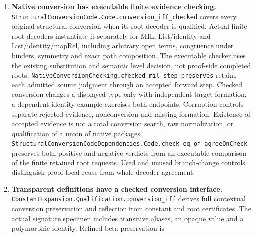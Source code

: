 \documentclass[11pt]{article}
\theoremstyle{definition}
\theoremstyle{remark}
\begin{document}
\begin{enumerate}
  exact original conversion with its conservative proof-only completion.
  Retained metadata coherence, binding laws and cofinal development give
  \nolinkurl{NativeRelatorConversionParallel.diamond} and the actual Pi/Sigma
  boundaries. \nolinkurl{FormationSensitiveNativeRelatorQualification.steps_preserve}
  preserves independently admitted judgments through all finite contextual
  runs of the original five-root package. Its checked-step interface needs
  no additional target-typing premise. Conversion cannot identify Pi or
  Sigma with a universe head; every purported finite code across either
  boundary fails. Neither original execution confluence nor normalization
  is claimed. The positive mixed-metadata completion control has no exact
  authored root, so the proof presentation is not a replacement runtime.
\item \textbf{Native conversion has executable finite evidence checking.}
  \nolinkurl{StructuralConversionCode.Code.conversion_iff_checked} covers
  every original structural conversion when its root decoder is qualified.
  Actual finite root decoders instantiate it separately for MIL,
  List/identity and List/identity/mapRel, including arbitrary open terms, congruence under binders,
  symmetry and exact path composition. The executable checker uses the
  existing substitution and semantic level decision, not proof-side completed
  roots. \nolinkurl{NativeConversionChecking.checked_mil_step_preserves}
  retains each admitted source judgment through an accepted forward step.
  Checked conversion changes a displayed type only with independent target
  formation; a dependent identity example exercises both endpoints.
  Corruption controls separate rejected evidence, nonconversion and missing
  formation. Existence of accepted evidence is not a total conversion search,
  raw normalization, or qualification of a union of native packages.
  \nolinkurl{StructuralConversionCodeDependencies.Code.check_eq_of_agreeOnCheck}
  preserves both positive and negative verdicts from an executable comparison
  of the finite retained root requests. Used and unused branch-change controls
  distinguish proof-local reuse from whole-decoder agreement.
\item \textbf{Transparent definitions have a checked conversion interface.}
  \nolinkurl{ConstantExpansion.Qualification.conversion_iff} derives full
  contextual conversion preservation and reflection from constant and root
  certificates. The actual signature specimen includes transitive aliases,
  an opaque value and a polymorphic identity. Refined beta preservation is

\end{enumerate}
\end{document}
